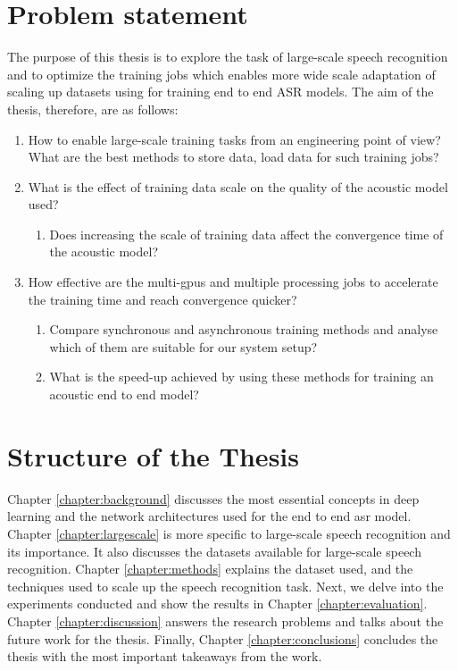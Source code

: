 \section{Problem statement}
\label{section:rq}
The purpose of this thesis is to explore the task of large-scale speech recognition and to optimize the training jobs which enables more wide scale adaptation of scaling up datasets using for training end to end ASR models. The aim of the thesis, therefore, are as follows:

\begin{enumerate}
  \item How to enable large-scale training tasks from an engineering point of view? What are the best  methods  to  store data, load data for such training jobs?
  \item What is the effect of training data scale on the quality of the acoustic model used?
    \begin{enumerate}
        \item Does increasing the scale of training data affect the convergence time of the acoustic model?
    \end{enumerate}
  \item How effective are the multi-\acrshort{gpu}s and multiple processing jobs to accelerate the training time and reach convergence quicker? 
    \begin{enumerate}
        \item Compare synchronous and asynchronous training methods and analyse which of them are suitable for our system setup? 
        \item What is the speed-up achieved by using these methods for training an acoustic end to end model?
    \end{enumerate}
\end{enumerate}




\section{Structure of the Thesis}
\label{section:structure} 
Chapter \ref{chapter:background} discusses the most essential concepts in deep learning and the network architectures used for the end to end \acrshort{asr} model. Chapter \ref{chapter:largescale} is more specific to large-scale speech recognition and its importance. It also discusses the datasets available for large-scale speech recognition. Chapter \ref{chapter:methods} explains the dataset used, and the techniques used to scale up the speech recognition task. Next, we delve into the experiments conducted and show the results in Chapter \ref{chapter:evaluation}. Chapter \ref{chapter:discussion} answers the research problems and  talks about the future work for the thesis. Finally, Chapter \ref{chapter:conclusions} concludes the thesis with the most important takeaways from the work.
